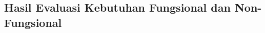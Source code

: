 \subsection{Hasil Evaluasi Kebutuhan Fungsional dan Non-Fungsional}
\label{subsec:hasil-evaluasi-kebutuhan-fungsional-dan-non-fungsional}